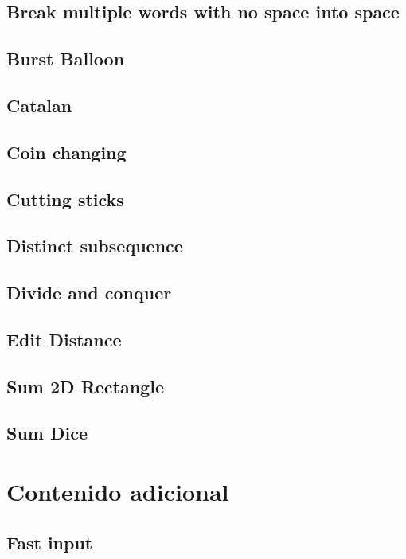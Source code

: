 \documentclass[oneside]{book}
\begin{document}
	\section{Break multiple words with no space into space}
	
	\section{Burst Balloon}
	
	\section{Catalan}
	
	\section{Coin changing}
	
	\section{Cutting sticks}
	
	\section{Distinct subsequence}
	
	\section{Divide and conquer}
	
	\section{Edit Distance}
	
	\section{Sum 2D Rectangle}
	
	\section{Sum Dice}
	
	
	
	
	\chapter{Contenido adicional}
	\section{Fast input}
	
\end{document}
